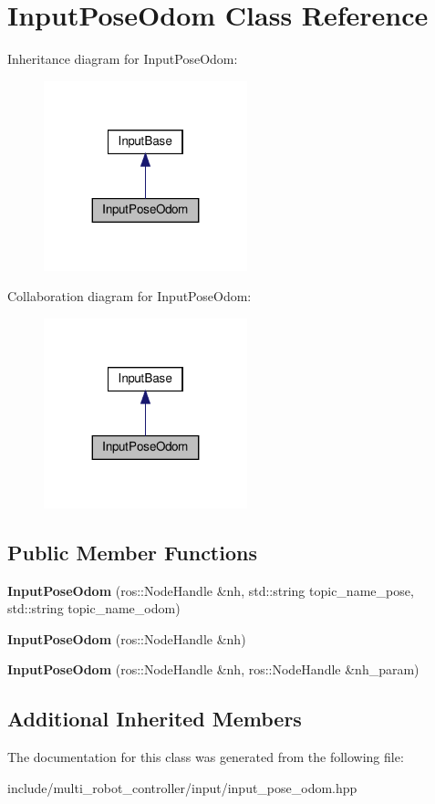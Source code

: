 \hypertarget{classInputPoseOdom}{}\section{Input\+Pose\+Odom Class Reference}
\label{classInputPoseOdom}


Inheritance diagram for Input\+Pose\+Odom\+:\nopagebreak
\begin{figure}[H]
\begin{center}
\leavevmode
\includegraphics[width=167pt]{d3/dea/classInputPoseOdom__inherit__graph}
\end{center}
\end{figure}


Collaboration diagram for Input\+Pose\+Odom\+:\nopagebreak
\begin{figure}[H]
\begin{center}
\leavevmode
\includegraphics[width=167pt]{dd/d6d/classInputPoseOdom__coll__graph}
\end{center}
\end{figure}
\subsection*{Public Member Functions}
\begin{DoxyCompactItemize}
\item 
{\bfseries Input\+Pose\+Odom} (ros\+::\+Node\+Handle \&nh, std\+::string topic\+\_\+name\+\_\+pose, std\+::string topic\+\_\+name\+\_\+odom)
\item 
{\bfseries Input\+Pose\+Odom} (ros\+::\+Node\+Handle \&nh)
\item 
{\bfseries Input\+Pose\+Odom} (ros\+::\+Node\+Handle \&nh, ros\+::\+Node\+Handle \&nh\+\_\+param)
\end{DoxyCompactItemize}
\subsection*{Additional Inherited Members}


The documentation for this class was generated from the following file\+:\begin{DoxyCompactItemize}
\item 
include/multi\+\_\+robot\+\_\+controller/input/input\+\_\+pose\+\_\+odom.\+hpp\end{DoxyCompactItemize}
